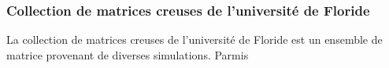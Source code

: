 \subsubsection{Collection de matrices creuses de l'université de Floride}
La collection de matrices creuses de l'université de Floride est un ensemble de matrice provenant de diverses simulations.
%
Parmis
